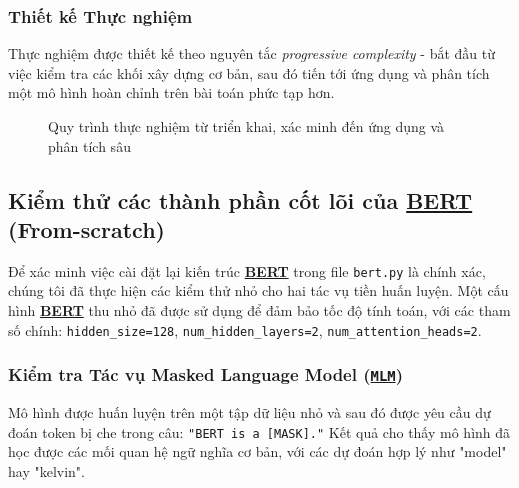 \subsubsection{Thiết kế Thực nghiệm}
Thực nghiệm được thiết kế theo nguyên tắc \textit{progressive complexity} - bắt đầu từ việc kiểm tra các khối xây dựng cơ bản, sau đó tiến tới ứng dụng và phân tích một mô hình hoàn chỉnh trên bài toán phức tạp hơn.

\begin{figure}[H]
\centering
{}
\caption{Quy trình thực nghiệm từ triển khai, xác minh đến ứng dụng và phân tích sâu}
\label{fig:experiment_workflow}
\end{figure}

\subsection{Kiểm thử các thành phần cốt lõi của \hyperref[acro:bert]{\textbf{BERT}} (From-scratch)}
\label{ssec:kiem_thu_cot_loi}
Để xác minh việc cài đặt lại kiến trúc \hyperref[acro:bert]{\textbf{BERT}} trong file \texttt{bert.py} là chính xác, chúng tôi đã thực hiện các kiểm thử nhỏ cho hai tác vụ tiền huấn luyện. Một cấu hình \hyperref[acro:bert]{\textbf{BERT}} thu nhỏ đã được sử dụng để đảm bảo tốc độ tính toán, với các tham số chính: \texttt{hidden\_size=128}, \texttt{num\_hidden\_layers=2}, \texttt{num\_attention\_heads=2}.

\subsubsection{Kiểm tra Tác vụ Masked Language Model (\hyperref[acro:mlm]{\texttt{MLM}})}
Mô hình được huấn luyện trên một tập dữ liệu nhỏ và sau đó được yêu cầu dự đoán token bị che trong câu: \texttt{"BERT is a [MASK]."}
Kết quả cho thấy mô hình đã học được các mối quan hệ ngữ nghĩa cơ bản, với các dự đoán hợp lý như "model" hay "kelvin".

